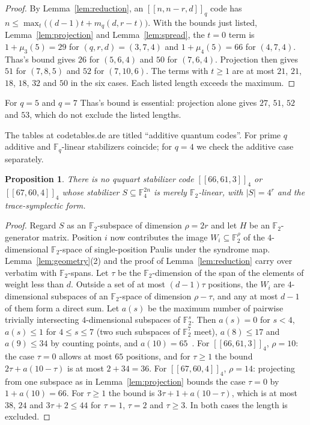 \documentclass[11pt]{amsart}
\newtheorem{proposition}[theorem]{Proposition}
\theoremstyle{definition}
\theoremstyle{remark}
\newcommand{\F}{\mathbb F}
\newcommand{\qq}[1]{[\![#1]\!]}
\begin{document}
\begin{proof}
By Lemma~\ref{lem:reduction}, an $\qq{n,n-r,d}_q$ code has $n\le\max_t\bigl((d-1)t+m_q(d,r-t)\bigr)$. With the bounds just listed, Lemma~\ref{lem:projection} and Lemma~\ref{lem:spread}, the $t=0$ term is $1+\mu_3(5)=29$ for $(q,r,d)=(3,7,4)$ and $1+\mu_4(5)=66$ for $(4,7,4)$. Thas's bound gives $26$ for $(5,6,4)$ and $50$ for $(7,6,4)$. Projection then gives $51$ for $(7,8,5)$ and $52$ for $(7,10,6)$. The terms with $t\ge1$ are at most $21$, $21$, $18$, $18$, $32$ and $50$ in the six cases. Each listed length exceeds the maximum.
\end{proof}

For $q=5$ and $q=7$ Thas's bound is essential: projection alone gives $27$, $51$, $52$ and $53$, which do not exclude the listed lengths.

The tables at codetables.de are titled ``additive quantum codes''. For prime $q$ additive and $\F_q$-linear stabilizers coincide; for $q=4$ we check the additive case separately.

\begin{proposition}\label{prop:additive}
There is no ququart stabilizer code $\qq{66,61,3}_4$ or $\qq{67,60,4}_4$ whose stabilizer $S\subseteq\F_4^{2n}$ is merely $\F_2$-linear, with $|S|=4^{r}$ and the trace-symplectic form.
\end{proposition}

\begin{proof}
Regard $S$ as an $\F_2$-subspace of dimension $\rho=2r$ and let $H$ be an $\F_2$-generator matrix. Position $i$ now contributes the image $W_i\subseteq\F_2^{\rho}$ of the $4$-dimensional $\F_2$-space of single-position Paulis under the syndrome map. Lemma~\ref{lem:geometry}(2) and the proof of Lemma~\ref{lem:reduction} carry over verbatim with $\F_2$-spans. Let $\tau$ be the $\F_2$-dimension of the span of the elements of weight less than $d$. Outside a set of at most $(d-1)\tau$ positions, the $W_i$ are $4$-dimensional subspaces of an $\F_2$-space of dimension $\rho-\tau$, and any at most $d-1$ of them form a direct sum. Let $a(s)$ be the maximum number of pairwise trivially intersecting $4$-dimensional subspaces of $\F_2^s$. Then $a(s)=0$ for $s<4$, $a(s)\le1$ for $4\le s\le7$ (two such subspaces of $\F_2^7$ meet), $a(8)\le17$ and $a(9)\le34$ by counting points, and $a(10)=65$~\cite{NastaseSissokho2017}. For $\qq{66,61,3}_4$, $\rho=10$: the case $\tau=0$ allows at most $65$ positions, and for $\tau\ge1$ the bound $2\tau+a(10-\tau)$ is at most $2+34=36$. For $\qq{67,60,4}_4$, $\rho=14$: projecting from one subspace as in Lemma~\ref{lem:projection} bounds the case $\tau=0$ by $1+a(10)=66$. For $\tau\ge1$ the bound is $3\tau+1+a(10-\tau)$, which is at most $38$, $24$ and $3\tau+2\le44$ for $\tau=1$, $\tau=2$ and $\tau\ge3$. In both cases the length is excluded.
\end{proof}
\end{document}
